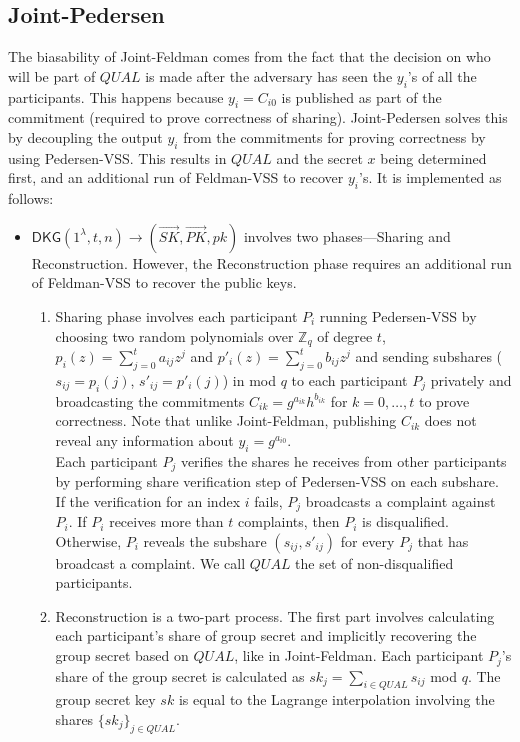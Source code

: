 \documentclass[letterpaper,twocolumn,10pt]{article}
\theoremstyle{definition}
\theoremstyle{remark}
\begin{document}
\subsection{Joint-Pedersen}
\label{appendix:jointPedersen}
The biasability of Joint-Feldman comes from the fact that the decision on who will be part of $QUAL$ is made after the adversary has seen the $y_i$'s of all the participants. This happens because $y_i = C_{i0}$ is published as part of the commitment (required to prove correctness of sharing). Joint-Pedersen solves this by decoupling the output $y_i$ from the commitments for proving correctness by using Pedersen-VSS. This results in $QUAL$ and the secret $x$ being determined first, and an additional run of Feldman-VSS to recover $y_i$'s. It is implemented as follows:
\begin{itemize}
    \item $\mathsf{DKG}(1^{\lambda}, t, n) \rightarrow (\vec{SK}, \vec{PK}, pk)$ involves two phases---Sharing and Reconstruction. However, the Reconstruction phase requires an additional run of Feldman-VSS to recover the public keys. 
    \begin{enumerate}
    \item Sharing phase involves each participant $P_i$ running Pedersen-VSS by choosing two random polynomials over $\mathbb{Z}_q$ of degree $t$, $p_i(z) = \sum_{j = 0}^{t} a_{ij} z^j$ and $p'_i(z) = \sum_{j = 0}^{t} b_{ij} z^j$ and sending subshares ($s_{ij} = p_i(j)$, $s'_{ij} = p'_i(j)$) in mod $q$ to each participant $P_j$ privately and broadcasting the commitments $C_{ik} = g^{a_{ik}} h^{b_{ik}}$ for $k = 0, \ldots, t$ to prove correctness. Note that unlike Joint-Feldman, publishing $C_{ik}$ does not reveal any information about $y_i = g^{a_{i0}}$.\\
    Each participant $P_j$ verifies the shares he receives from other participants by performing share verification step of Pedersen-VSS on each subshare. If the verification for an index $i$ fails, $P_j$ broadcasts a complaint against $P_i$.
    If $P_i$ receives more than $t$ complaints, then $P_i$ is disqualified. Otherwise, $P_i$ reveals the subshare $(s_{ij}, s'_{ij})$ for every $P_j$ that has broadcast a complaint. We call $QUAL$ the set of non-disqualified participants.
    
    \item Reconstruction is a two-part process. The first part involves calculating each participant's share of group secret and implicitly recovering the group secret based on $QUAL$, like in Joint-Feldman. Each participant $P_j$'s share of the group secret is calculated as $sk_j = \sum_{i \in QUAL} s_{ij}$ mod $q$.  The group secret key $sk$ is equal to the Lagrange interpolation involving the shares $\{sk_j\}_{j \in QUAL}$. 
    

\end{enumerate}
\end{itemize}
\end{document}
